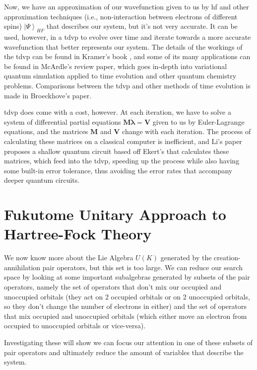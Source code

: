 \documentclass{aux/ttuthes2007}
\newcommand{\ket}[1]{\ensuremath{\left|#1\right\rangle}}
\newcommand{\orb}{K}
\begin{document}
	Now, we have an approximation of our wavefunction given to us by \gls{hf} and other approximation techniques (i.e., non-interaction between electrons of different spins) $\ket\Psi_{HF}$ that describes our system, but it's not very accurate. It can be used, however, in a \gls{tdvp} to evolve over time and iterate towards a more accurate wavefunction that better represents our system. The details of the workings of the \gls{tdvp} can be found in Kramer's book , and some of its many applications can be found in McArdle's  review paper, which goes in-depth into variational quantum simulation applied to time evolution and other quantum chemistry problems. Comparisons between the \gls{tdvp} and other methods of time evolution is made in Broeckhove's  paper.

	\gls{tdvp} does come with a cost, however. At each iteration, we have to solve a system of differential partial equations $\bm M \dot {\bm \lambda} = \bm V$ given to us by Euler-Lagrange equations, and the matrices $\bm M$ and $\bm V$ change with each iteration. The process of calculating these matrices on a classical computer is inefficient, and Li's paper  proposes a shallow quantum circuit based off Ekert's  that calculates these matrices, which feed into the \gls{tdvp}, speeding up the process while also having some built-in error tolerance, thus avoiding the error rates that accompany deeper quantum circuits.

\section {\textbf{Fukutome Unitary Approach to Hartree-Fock Theory}}

We now know more about the Lie Algebra $U(\orb)$ generated by the creation-annihilation pair operators, but this set is too large.
We can reduce our search space by looking at some important subalgebras generated by subsets of the pair operators, namely the set of operators that don't mix our occupied and unoccupied orbitals (they act on 2 occupied orbitals or on 2 unoccupied orbitals, so they don't change the number of electrons in either) and the set of operators that mix occupied and unoccupied orbitals (which either move an electron from occupied to unoccupied orbitals or vice-versa).

Investigating these will show we can focus our attention in one of these subsets of pair operators and ultimately reduce the amount of variables that describe the system.
\end{document}
